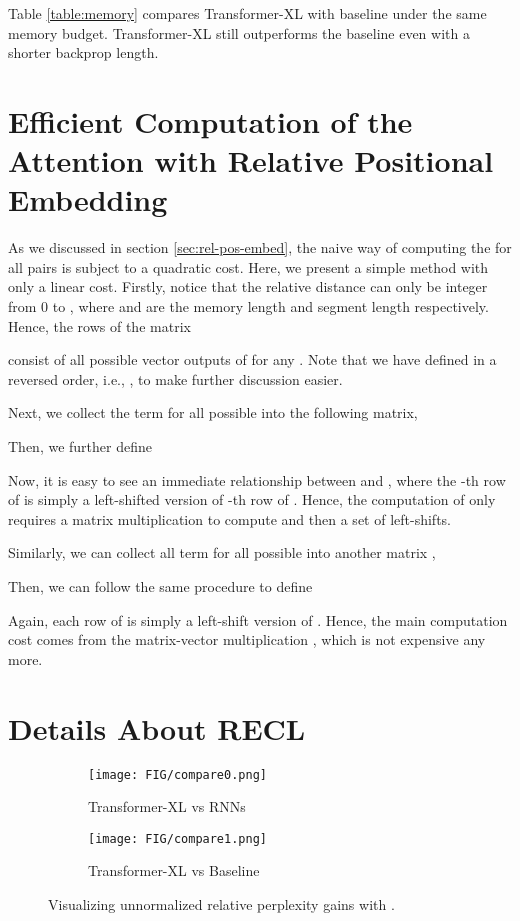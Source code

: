 \documentclass[11pt,a4paper]{article}
\begin{document}
Table \ref{table:memory} compares Transformer-XL with baseline under the same memory budget. Transformer-XL still outperforms the baseline even with a shorter backprop length.

\section{Efficient Computation of the Attention with Relative Positional Embedding}
\label{sec:A-efficient-attention}
As we discussed in section \ref{sec:rel-pos-embed}, the naive way of computing the  for all pairs  is subject to a quadratic cost.
Here, we present a simple method with only a linear cost.
Firstly, notice that the relative distance  can only be integer from 0 to , where  and  are the memory length and segment length respectively.
Hence, the rows of the matrix

consist of all possible vector outputs of  for any .
Note that we have defined  in a reversed order, i.e., , to make further discussion easier.

Next, we collect the term  for all possible  into the following  matrix,

Then, we further define

Now, it is easy to see an immediate relationship between  and , where the -th row of  is simply a left-shifted version of -th row of .
Hence, the computation of  only requires a matrix multiplication  to compute  and then a set of left-shifts.

Similarly, we can collect all term  for all possible  into another  matrix ,

Then, we can follow the same procedure to define

Again, each row of  is simply a left-shift version of .
Hence, the main computation cost comes from the matrix-vector multiplication , which is not expensive any more.

\section{Details About RECL} \label{sec:recl}
\begin{figure}[!h]
	\begin{subfigure}[b]{0.5\textwidth}
		\texttt{[image: FIG/compare0.png]}
		\caption{Transformer-XL vs RNNs}
		\label{fig:vsrnn}
	\end{subfigure}
	\begin{subfigure}[b]{0.5\textwidth}
		\texttt{[image: FIG/compare1.png]}
		\caption{Transformer-XL vs Baseline}
		\label{fig:vsbase}
	\end{subfigure}
	\caption{Visualizing unnormalized relative perplexity gains with .}
	\label{fig:gain}
\end{figure}
\end{document}
